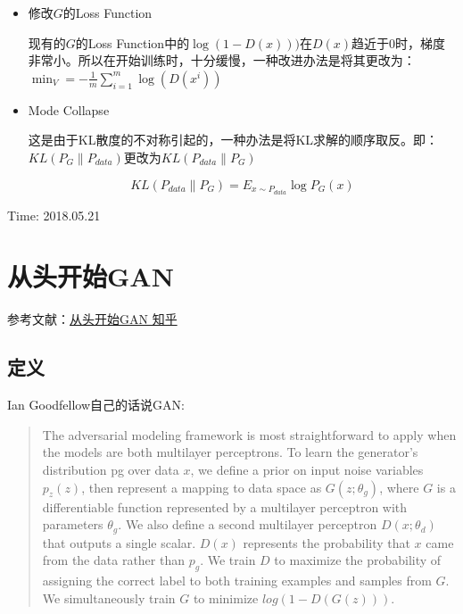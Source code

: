\begin{itemize}
\item 修改$G$的Loss Function

现有的$G$的Loss Function中的$\log (1- D(x)))$在$D(x)$趋近于0时，梯度非常小。所以在开始训练时，十分缓慢，一种改进办法是将其更改为：$\min_V = -\frac{1}{m}\sum_{i=1}^{m}\log(D(x^i))$


\item Mode Collapse

这是由于KL散度的不对称引起的，一种办法是将KL求解的顺序取反。即：$KL(P_{G} \parallel P_{data})$更改为$KL(P_{data} \parallel P_{G})$

\begin{displaymath}
KL(P_{data} \parallel P_{G}) = E_{x \sim P_{data}} \log P_G(x)
\end{displaymath}

\end{itemize}

{\color{red} Time: 2018.05.21}

\section{从头开始GAN}

参考文献：\href{https://zhuanlan.zhihu.com/p/27012520}{从头开始GAN 知乎}

\subsection{定义}

Ian Goodfellow自己的话说GAN\cite{Goodfellow2014GAN}:
\begin{quote}
The adversarial modeling framework is most straightforward to apply when the models are both
multilayer perceptrons. To learn the generator’s distribution pg over data $x$, we define a prior on
input noise variables $p_z(z)$, then represent a mapping to data space as $G(z; θ_g)$, where $G$ is a
differentiable function represented by a multilayer perceptron with parameters $θ_g$. We also define a
second multilayer perceptron $D(x; θ_d)$ that outputs a single scalar. $D(x)$ represents the probability
that $x$ came from the data rather than $p_g$. We train $D$ to maximize the probability of assigning the
correct label to both training examples and samples from $G$. We simultaneously train $G$ to minimize
$log(1 − D(G(z)))$.
\end{quote}

